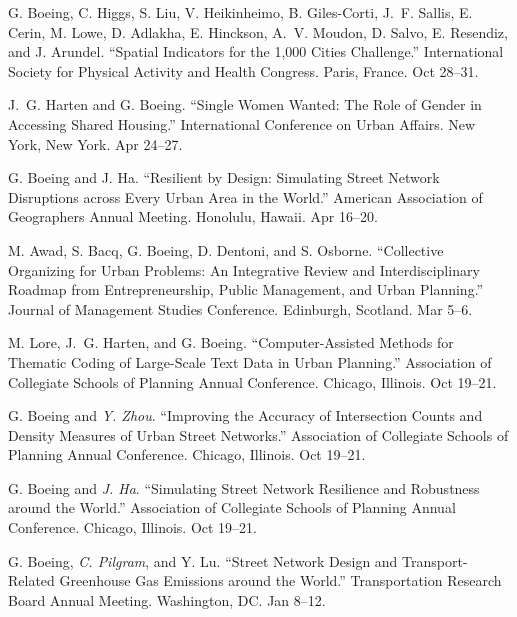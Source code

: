 \documentclass[11pt,letterpaper]{report} %
\begin{document}
\begin{tablist}
\item[2024] \tab{}G. Boeing, C. Higgs, S. Liu, V. Heikinheimo, B. Giles-Corti, J.~F. Sallis, E. Cerin, M. Lowe, D. Adlakha, E. Hinckson, A.~V. Moudon, D. Salvo, E. Resendiz, and J. Arundel. \enquote{Spatial Indicators for the 1,000 Cities Challenge.} International Society for Physical Activity and Health Congress. Paris, France. Oct 28--31.

\item[2024] \tab{}J.~G. Harten and G. Boeing. \enquote{Single Women Wanted: The Role of Gender in Accessing Shared Housing.} International Conference on Urban Affairs. New York, New York. Apr 24--27.

\item[2024] \tab{}G. Boeing and J. Ha. \enquote{Resilient by Design: Simulating Street Network Disruptions across Every Urban Area in the World.} American Association of Geographers Annual Meeting. Honolulu, Hawaii. Apr 16--20.

\item[2024] \tab{}M. Awad, S. Bacq, G. Boeing, D. Dentoni, and S. Osborne. \enquote{Collective Organizing for Urban Problems: An Integrative Review and Interdisciplinary Roadmap from Entrepreneurship, Public Management, and Urban Planning.} Journal of Management Studies Conference. Edinburgh, Scotland. Mar 5--6.

\item[2023] \tab{}M. Lore, J.~G. Harten, and G. Boeing. \enquote{Computer-Assisted Methods for Thematic Coding of Large-Scale Text Data in Urban Planning.} Association of Collegiate Schools of Planning Annual Conference. Chicago, Illinois. Oct 19--21.

\item[2023] \tab{}G. Boeing and \textit{Y. Zhou}. \enquote{Improving the Accuracy of Intersection Counts and Density Measures of Urban Street Networks.} Association of Collegiate Schools of Planning Annual Conference. Chicago, Illinois. Oct 19--21.

\item[2023] \tab{}G. Boeing and \textit{J. Ha}. \enquote{Simulating Street Network Resilience and Robustness around the World.} Association of Collegiate Schools of Planning Annual Conference. Chicago, Illinois. Oct 19--21.

\item[2023] \tab{}G. Boeing, \textit{C. Pilgram}, and Y. Lu. \enquote{Street Network Design and Transport-Related Greenhouse Gas Emissions around the World.} Transportation Research Board Annual Meeting. Washington, DC\@. Jan 8--12.


\end{tablist}
\end{document}
